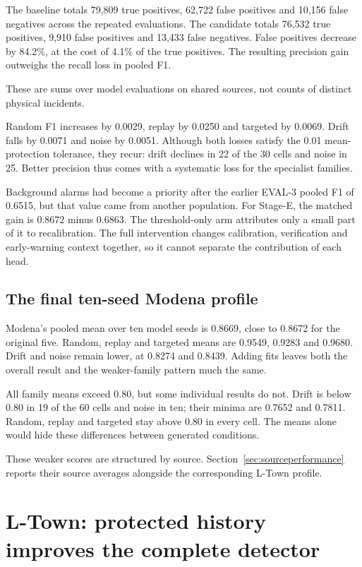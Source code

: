 

The baseline totals 79,809 true positives, 62,722 false positives and 10,156 false negatives across the repeated evaluations. The candidate totals 76,532 true positives, 9,910 false positives and 13,433 false negatives. False positives decrease by 84.2\%, at the cost of 4.1\% of the true positives. The resulting precision gain outweighs the recall loss in pooled F1.

These are sums over model evaluations on shared sources, not counts of distinct physical incidents.

Random F1 increases by 0.0029, replay by 0.0250 and targeted by 0.0069. Drift falls by 0.0071 and noise by 0.0051. Although both losses satisfy the 0.01 mean-protection tolerance, they recur: drift declines in 22 of the 30 cells and noise in 25. Better precision thus comes with a systematic loss for the specialist families.

Background alarms had become a priority after the earlier EVAL-3 pooled F1 of 0.6515, but that value came from another population. For Stage-E, the matched gain is 0.8672 minus 0.6863. The threshold-only arm attributes only a small part of it to recalibration. The full intervention changes calibration, verification and early-warning context together, so it cannot separate the contribution of each head.

\subsection{The final ten-seed Modena profile}
Modena's pooled mean over ten model seeds is 0.8669, close to 0.8672 for the original five. Random, replay and targeted means are 0.9549, 0.9283 and 0.9680. Drift and noise remain lower, at 0.8274 and 0.8439. Adding fits leaves both the overall result and the weaker-family pattern much the same.

All family means exceed 0.80, but some individual results do not. Drift is below 0.80 in 19 of the 60 cells and noise in ten; their minima are 0.7652 and 0.7811. Random, replay and targeted stay above 0.80 in every cell. The means alone would hide these differences between generated conditions.

These weaker scores are structured by source. Section~\ref{sec:sourceperformance} reports their source averages alongside the corresponding L-Town profile.

\section{L-Town: protected history improves the complete detector}
